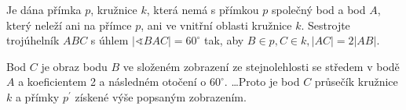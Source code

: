 \begin{priklad}
Je dána přímka $p$, kružnice $k$, která nemá s přímkou $p$ společný bod a bod $A$, který
neleží ani na přímce $p$, ani ve vnitřní oblasti kružnice $k$. Sestrojte trojúhelník
$ABC$ s úhlem $|\sphericalangle BAC|=60^\circ$ tak, aby $B\in p, C \in k, |AC|=2|AB|.$
\end{priklad}

\begin{reseni}
Bod $C$ je obraz bodu $B$ ve složeném zobrazení ze stejnolehlosti se středem v bodě
$A$ a koeficientem 2 a následném otočení o $60^\circ.$ \dots Proto je bod $C$ průsečík
kružnice $k$ a přímky $p^\prime$ získené výše popsaným zobrazením.
\end{reseni}
